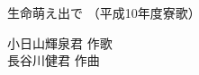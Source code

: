 \documentclass[10pt,b5j]{tarticle} %
\begin{document}
\begin{minipage}[c]{0.7\hsize} %
    \begin{center}
        {\LARGE
            生命萌え出で %
        }
        {\small 
            （平成10年度寮歌） %
        }
    \end{center}
\end{minipage}
\begin{minipage}[c]{0.3\hsize} %
    \begin{flushright} %
        小日山輝泉君 作歌\\長谷川健君 作曲 %
    \end{flushright}
\end{minipage}
\end{document}

